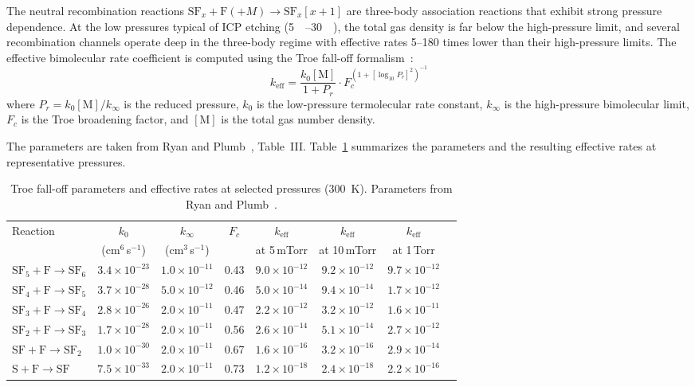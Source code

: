 \documentclass[11pt,a4paper]{report}
\newcommand{\SFx}{\mathrm{SF}_x}
\newcommand{\SFsix}{\mathrm{SF}_6}
\newcommand{\SFfive}{\mathrm{SF}_5}
\newcommand{\SFfour}{\mathrm{SF}_4}
\newcommand{\SFthree}{\mathrm{SF}_3}
\begin{document}
The neutral recombination reactions $\SFx + \mathrm{F} (+M) \to \SFx[x+1]$ are three-body association reactions that exhibit strong pressure dependence.  At the low pressures typical of ICP etching (\SIrange{5}{30}{\milli\torr}), the total gas density is far below the high-pressure limit, and several recombination channels operate deep in the three-body regime with effective rates 5--180 times lower than their high-pressure limits.  The effective bimolecular rate coefficient is computed using the Troe fall-off formalism~\cite{Troe1977}:
\begin{equation}
\boxed{k_\mathrm{eff} = \frac{k_0 [\mathrm{M}]}{1 + P_r} \cdot F_c^{\left(1 + [\log_{10} P_r]^2\right)^{-1}}}
\label{eq:gas_troe}
\end{equation}
where $P_r = k_0[\mathrm{M}]/k_\infty$ is the reduced pressure, $k_0$ is the low-pressure termolecular rate constant, $k_\infty$ is the high-pressure bimolecular limit, $F_c$ is the Troe broadening factor, and $[\mathrm{M}]$ is the total gas number density.

The parameters are taken from Ryan and Plumb~\cite{Ryan1990}, Table~III.  Table~\ref{tab:gas_troe} summarizes the parameters and the resulting effective rates at representative pressures.

\begin{table}[H]
\centering
\caption{Troe fall-off parameters and effective rates at selected pressures (\SI{300}{\kelvin}).  Parameters from Ryan and Plumb~\cite{Ryan1990}.}
\label{tab:gas_troe}
\small
\begin{tabular}{lccccccc}
\toprule
Reaction & $k_0$ & $k_\infty$ & $F_c$ & $k_\mathrm{eff}$ & $k_\mathrm{eff}$ & $k_\mathrm{eff}$ \\
& (cm$^6$\,s$^{-1}$) & (cm$^3$\,s$^{-1}$) & & at 5\,mTorr & at 10\,mTorr & at 1\,Torr \\
\midrule
$\SFfive + \mathrm{F} \to \SFsix$ & $3.4\times10^{-23}$ & $1.0\times10^{-11}$ & 0.43 & $9.0\times10^{-12}$ & $9.2\times10^{-12}$ & $9.7\times10^{-12}$ \\
$\SFfour + \mathrm{F} \to \SFfive$ & $3.7\times10^{-28}$ & $5.0\times10^{-12}$ & 0.46 & $5.0\times10^{-14}$ & $9.4\times10^{-14}$ & $1.7\times10^{-12}$ \\
$\SFthree + \mathrm{F} \to \SFfour$ & $2.8\times10^{-26}$ & $2.0\times10^{-11}$ & 0.47 & $2.2\times10^{-12}$ & $3.2\times10^{-12}$ & $1.6\times10^{-11}$ \\
$\mathrm{SF}_2 + \mathrm{F} \to \SFthree$ & $1.7\times10^{-28}$ & $2.0\times10^{-11}$ & 0.56 & $2.6\times10^{-14}$ & $5.1\times10^{-14}$ & $2.7\times10^{-12}$ \\
$\mathrm{SF} + \mathrm{F} \to \mathrm{SF}_2$ & $1.0\times10^{-30}$ & $2.0\times10^{-11}$ & 0.67 & $1.6\times10^{-16}$ & $3.2\times10^{-16}$ & $2.9\times10^{-14}$ \\
$\mathrm{S} + \mathrm{F} \to \mathrm{SF}$ & $7.5\times10^{-33}$ & $2.0\times10^{-11}$ & 0.73 & $1.2\times10^{-18}$ & $2.4\times10^{-18}$ & $2.2\times10^{-16}$ \\
\bottomrule
\end{tabular}
\end{table}
\end{document}
